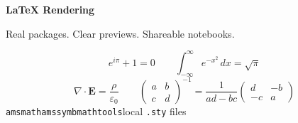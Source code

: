 \documentclass[border=24pt]{standalone}
\begin{document}
\color{ink}
\begin{minipage}{6.3in}
\sffamily
{\Huge\bfseries LaTeX Rendering}\par\vspace{8pt}
{\large Real packages. Clear previews. Shareable notebooks.}\par
\vspace{20pt}
\color{accent}\boldmath
\[
e^{i\pi}+1=0
\qquad
\int_{-\infty}^{\infty}e^{-x^2}\,dx=\sqrt{\pi}
\]
\[
\nabla\cdot\mathbf{E}=\frac{\rho}{\varepsilon_0}
\qquad
\begin{pmatrix}a&b\\c&d\end{pmatrix}^{-1}
=\frac{1}{ad-bc}\begin{pmatrix}d&-b\\-c&a\end{pmatrix}
\]
\vspace{12pt}\color{ink}
{\small\texttt{amsmath}\quad\texttt{amssymb}\quad\texttt{mathtools}\quad local \texttt{.sty} files}
\end{minipage}
\end{document}
